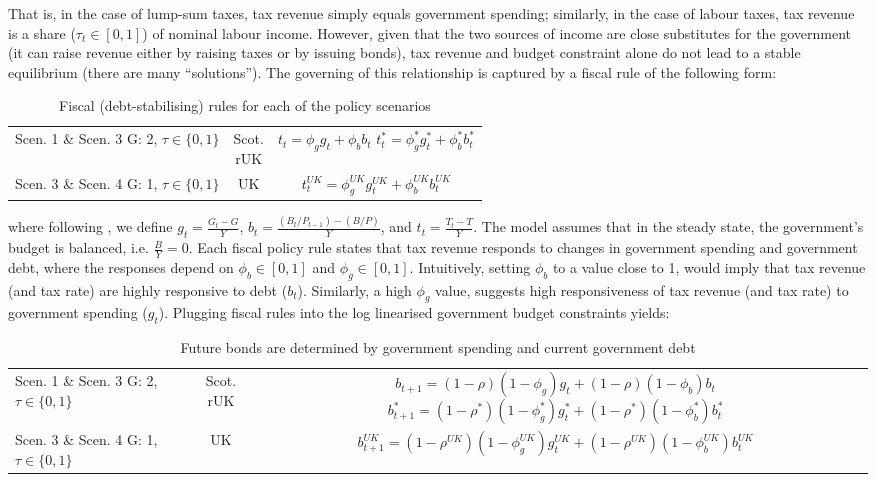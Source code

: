 That is, in the case of lump-sum taxes, tax revenue simply equals government spending; similarly, in the case of labour taxes, tax revenue is a share ($ \tau_t \in [0,1]$) of nominal labour income. However, given that the two sources of income are close substitutes for the government (it can raise revenue either by raising taxes or by issuing bonds), tax revenue and budget constraint alone do not lead to a stable equilibrium (there are many ``solutions''). The governing of this relationship is captured by a fiscal rule of the following form:
\begin{table}[H]
    \renewcommand{\arraystretch}{2}
    \centering
    \begin{tabular}{l|c|c}
        \makecell{Scen. 1 \& Scen. 3\\ G: 2, $\tau \in \{0, 1\}$} & \makecell{Scot. \\ rUK } & 
        \makecell{
            $t_t = \phi_g  g_t + \phi_b b_t$\\
            $t^*_t = \phi^*_g g^*_t + \phi^*_b b^*_t$\\
        }  \\ 
        \makecell{Scen. 3 \& Scen. 4\\ G: 1, $\tau \in \{0, 1\}$} & UK & 
        $t^{UK}_t = \phi^{UK}_g g^{UK}_t + \phi^{UK}_b b^{UK}_t$
    \end{tabular}
    \caption{Fiscal (debt-stabilising) rules for each of the policy scenarios}
\end{table}
where following \textcite{jordigal_2005_understanding}, we define $g_t = \frac{G_t-G}{Y}$, $b_t = \frac{(B_t/P_{t-1}) - (B/P)}{Y}$, and $t_t = \frac{T_t - T}{Y}$. The model assumes that in the steady state, the government's budget is balanced, i.e. $\frac{B}{Y} = 0$. Each fiscal policy rule states that tax revenue responds to changes in government spending and government debt, where the responses depend on $\phi_b \in [0,1]$ and $\phi_g \in [0,1]$. Intuitively, setting $\phi_b$ to a value close to 1, would imply that tax revenue (and tax rate) are highly responsive to debt ($b_t$). Similarly, a high $\phi_g$ value, suggests high responsiveness of tax revenue (and tax rate) to government spending ($g_t$). Plugging fiscal rules into the log linearised government budget constraints yields:
\begin{table}[H]
    \renewcommand{\arraystretch}{2}
    \centering
    \begin{tabular}{l|c|c}
    \makecell{Scen. 1 \& Scen. 3\\ G: 2, $\tau \in \{0, 1\}$} & \makecell{Scot. \\ rUK } & 
        \makecell{
            $b_{t+1} = (1-\rho)(1-\phi_g) g_t + (1-\rho)(1-\phi_b)b_t$\\
            $b^*_{t+1} = (1-\rho^*)(1-\phi^*_g) g^*_t + (1-\rho^*)(1-\phi^*_b)b^*_t$
        }  \\ 
    \makecell{Scen. 3 \& Scen. 4\\ G: 1, $\tau \in \{0, 1\}$} & UK & 
    $b^{UK}_{t+1} = (1-\rho^{UK})(1-\phi^{UK}_g) g^{UK}_t + (1-\rho^{UK})(1-\phi^{UK}_b)b^{UK}_t$
    \end{tabular}
    \caption{Future bonds are determined by government spending and current government debt}
\end{table}

